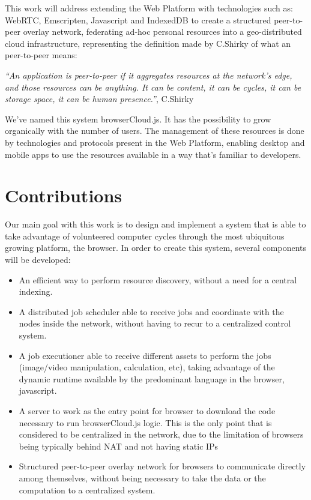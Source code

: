 This work will address extending the Web Platform with technologies such as: WebRTC, Emscripten, Javascript and IndexedDB to create a structured peer-to-peer overlay network, federating ad-hoc personal resources into a geo-distributed cloud infrastructure, representing the definition made by C.Shirky of what an peer-to-peer means:

  \textit{``An application is peer-to-peer if it aggregates resources at the network’s edge, and those resources can be anything. It can be content, it can be cycles, it can be storage space, it can be human presence.''}, C.Shirky \cite{Shirky.}

We've named this system browserCloud.js. It has the possibility to grow organically with the number of users. The management of these resources is done by technologies and protocols present in the Web Platform, enabling desktop and mobile apps to use the resources available in a way that's familiar to developers. 

\section{Contributions}

Our main goal with this work is to design and implement a system that is able to take advantage of volunteered computer cycles through the most ubiquitous growing platform, the browser. In order to create this system, several components will be developed:

\begin{itemize}
    \item An efficient way to perform resource discovery, without a need for a central indexing.
    \item A distributed job scheduler able to receive jobs and coordinate with the nodes inside the network, without having to recur to a centralized control system.
    \item A job executioner able to receive different assets to perform the jobs (image/video manipulation, calculation, etc), taking advantage of the dynamic runtime available by the predominant language in the browser, javascript.
    \item A server to work as the entry point for browser to download the code necessary to run browserCloud.js logic. This is the only point that is considered to be centralized in the network, due to the limitation of browsers being typically behind NAT and not having static IPs
    \item Structured peer-to-peer overlay network for browsers to communicate directly among themselves, without being necessary to take the data or the computation to a centralized system.
\end{itemize}

